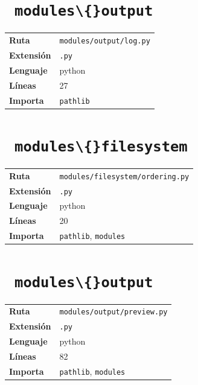\documentclass[12pt, a4paper]{report}
\begin{document}
\medskip

\section{\ \texttt{modules\textbackslash\{\}output}}

\begin{fichabox}
\small
\begin{tabular}{@{}ll@{}}
  \textbf{Ruta} & \texttt{modules/output/log.py} \\
  \textbf{Extensión} & \texttt{.py} \\
  \textbf{Lenguaje} & python \\
  \textbf{Líneas} & 27 \\
  \textbf{Importa} & \parbox[t]{10cm}{\texttt{pathlib}} \\
\end{tabular}
\end{fichabox}

\medskip

\section{\ \texttt{modules\textbackslash\{\}filesystem}}

\begin{fichabox}
\small
\begin{tabular}{@{}ll@{}}
  \textbf{Ruta} & \texttt{modules/filesystem/ordering.py} \\
  \textbf{Extensión} & \texttt{.py} \\
  \textbf{Lenguaje} & python \\
  \textbf{Líneas} & 20 \\
  \textbf{Importa} & \parbox[t]{10cm}{\texttt{pathlib}, \texttt{modules}} \\
\end{tabular}
\end{fichabox}

\medskip

\section{\ \texttt{modules\textbackslash\{\}output}}

\begin{fichabox}
\small
\begin{tabular}{@{}ll@{}}
  \textbf{Ruta} & \texttt{modules/output/preview.py} \\
  \textbf{Extensión} & \texttt{.py} \\
  \textbf{Lenguaje} & python \\
  \textbf{Líneas} & 82 \\
  \textbf{Importa} & \parbox[t]{10cm}{\texttt{pathlib}, \texttt{modules}} \\
\end{tabular}
\end{fichabox}
\end{document}
